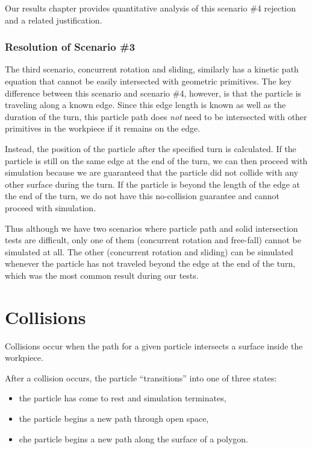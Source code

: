 Our results chapter provides quantitative analysis of this scenario \#4 rejection and a related justification.

		\subsubsection{Resolution of Scenario \#3}

The third scenario, concurrent rotation and sliding, similarly has a kinetic path equation that cannot be easily intersected with geometric primitives. The key difference between this scenario and scenario \#4, however, is that the particle is traveling along a known edge. Since this edge length is known as well as the duration of the turn, this particle path does \emph{not} need to be intersected with other primitives in the workpiece if it remains on the edge.

Instead, the position of the particle after the specified turn is calculated. If the particle is still on the same edge at the end of the turn, we can then proceed with simulation because we are guaranteed that the particle did not collide with any other surface during the turn. If the particle is beyond the length of the edge at the end of the turn, we do not have this no-collision guarantee and cannot proceed with simulation.

Thus although we have two scenarios where particle path and solid intersection tests are difficult, only one of them (concurrent rotation and free-fall) cannot be simulated at all. The other (concurrent rotation and sliding) can be simulated whenever the particle has not traveled beyond the edge at the end of the turn, which was the most common result during our tests.

	\section{Collisions}

Collisions occur when the path for a given particle intersects a surface inside the workpiece.


After a collision occurs, the particle ``transitions'' into one of three states:

\begin{itemize}
\item the particle has come to rest and simulation terminates,
\item the particle begins a new path through open space,
\item ehe particle begins a new path along the surface of a polygon.
\end{itemize}

